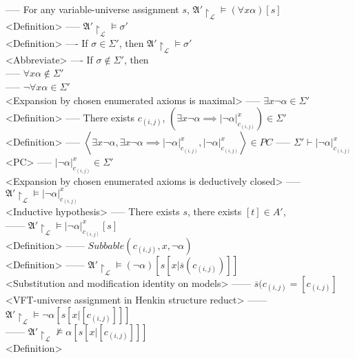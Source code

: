 \documentclass{book}
\newcommand{\inot}{\not}
\newcommand{\extend}[1]{\overline{#1}}
\newcommand{\seq}[1]{\left\langle #1 \right\rangle}
\newcommand{\sub}[3]{\left|#1\right|_{#3}^{#2}}
\begin{document}
					----- For any variable-universe assignment $s$, $\mathfrak{A}' \upharpoonright_\mathcal{L} \vDash (\forall x \alpha)[s]$ \\ <Definition>
					----- $\mathfrak{A}' \upharpoonright_\mathcal{L} \vDash \sigma'$ \\ <Definition>
				---- If $\sigma \in \Sigma'$, then $\mathfrak{A}' \upharpoonright_\mathcal{L} \vDash \sigma'$ \\ <Abbreviate>
				---- If $\sigma \inot \in \Sigma'$, then \\ 
					----- $\forall x \alpha \inot \in \Sigma'$ \\
					----- $\lnot \forall x \alpha \in \Sigma'$ \\ <Expansion by chosen enumerated axioms is maximal>
					----- $\exists x \lnot \alpha \in \Sigma'$ \\ <Definition>
					----- There exists $c_{(i, j)}$, $(\exists x \lnot \alpha \implies \sub{\lnot \alpha}{x}{c_{(i, j)}}) \in \Sigma'$ \\ <Definition>
					----- $\seq{\exists x \lnot \alpha, \exists x \lnot \alpha \implies \sub{\lnot \alpha}{x}{c_{(i, j)}}, \sub{\lnot \alpha}{x}{c_{(i, j)}}} \in PC$
					----- $\Sigma' \vdash \sub{\lnot \alpha}{x}{c_{(i, j)}}$ \\ <PC>
					----- $\sub{\lnot \alpha}{x}{c_{(i, j)}} \in \Sigma'$ \\ <Expansion by chosen enumerated axioms is deductively closed>
					----- $\mathfrak{A}' \upharpoonright_\mathcal{L} \vDash \sub{\lnot \alpha}{x}{c_{(i, j)}}$ \\ <Inductive hypothesis>
					----- There exists $s$, there exists $[t] \in A'$, \\
						------ $\mathfrak{A}' \upharpoonright_\mathcal{L} \vDash \sub{\lnot \alpha}{x}{c_{(i, j)}}[s]$ \\ <Definition>
						------ $Subbable(c_{(i, j)}, x, \lnot \alpha)$ \\ <Definition>
						------ $\mathfrak{A}' \upharpoonright_\mathcal{L} \vDash (\lnot \alpha)[s[x|\extend{s}(c_{(i, j)})]]$ \\ <Substitution and modification identity on models>
						------ $\extend{s}(c_{(i, j)} = [c_{(i, j)}]$ \\ <VFT-universe assignment in Henkin structure reduct>
						------ $\mathfrak{A}' \upharpoonright_\mathcal{L} \vDash \lnot \alpha[s[x|[c_{(i, j)}]]]$ \\
						------ $\mathfrak{A}' \upharpoonright_\mathcal{L} \inot \vDash \alpha[s[x|[c_{(i, j)}]]]$ \\ <Definition>
\end{document}
